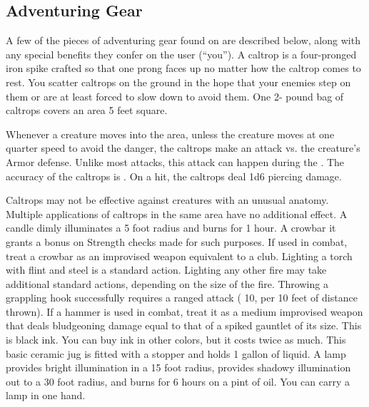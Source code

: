     \subsection{Adventuring Gear}
        A few of the pieces of adventuring gear found on  are described below, along with any special benefits they confer on the user (``you'').
         A caltrop is a four-pronged iron spike crafted so that one prong faces up no matter how the caltrop comes to rest. You scatter caltrops on the ground in the hope that your enemies step on them or are at least forced to slow down to avoid them. One 2- pound bag of caltrops covers an area 5 feet square.
        \par Whenever a creature moves into the area, unless the creature moves at one quarter speed to avoid the danger, the caltrops make an attack vs. the creature's Armor defense.
        Unlike most attacks, this attack can happen during the .
        The accuracy of the caltrops is .
        On a hit, the caltrops deal 1d6 piercing damage.
        \par Caltrops may not be effective against creatures with an unusual anatomy.
        Multiple applications of caltrops in the same area have no additional effect.
         A candle dimly illuminates a 5 foot radius and burns for 1 hour.
         A crowbar it grants a  bonus on Strength checks made for such purposes. If used in combat, treat a crowbar as an improvised weapon equivalent to a club.
         Lighting a torch with flint and steel is a standard action.
        Lighting any other fire may take additional standard actions, depending on the size of the fire.
         Throwing a grappling hook successfully requires a ranged attack ( 10,  per 10 feet of distance thrown).
         If a hammer is used in combat, treat it as a medium improvised weapon that deals bludgeoning damage equal to that of a spiked gauntlet of its size.
         This is black ink. You can buy ink in other colors, but it costs twice as much.
         This basic ceramic jug is fitted with a stopper and holds 1 gallon of liquid.
         A lamp provides bright illumination in a 15 foot radius, provides shadowy illumination out to a 30 foot radius, and burns for 6 hours on a pint of oil. You can carry a lamp in one hand.
